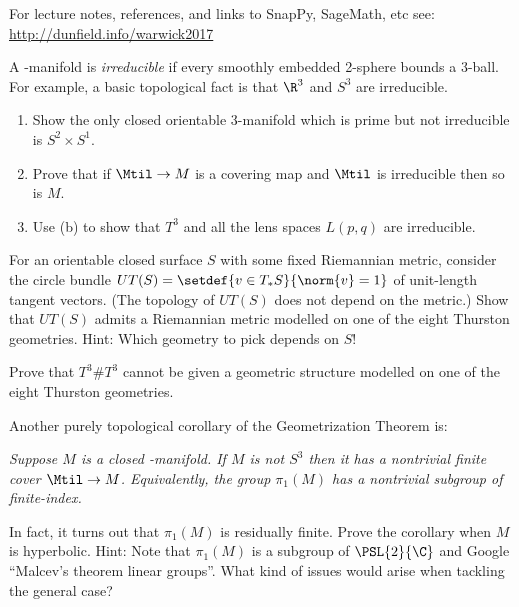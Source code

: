 \documentclass[tikz, a4paper]{nmd/hw}
\begin{document}

For lecture notes, references, and links to SnapPy, SageMath, etc see:
\\
\url{http://dunfield.info/warwick2017}


\begin{problems}
\item A \3-manifold is \emph{irreducible} if every smoothly embedded
  2-sphere bounds a 3-ball.  For example, a basic topological fact is
  that $\R^3$ and $S^3$ are irreducible.
  \begin{enumerate}
    \item Show the only closed orientable 3-manifold which is prime
      but not irreducible is $S^2 \times S^1$.
    \item Prove that if $\Mtil \to M$ is a covering map and $\Mtil$ is
      irreducible then so is $M$.

    \item Use (b) to show that $T^3$ and all the lens
      spaces $L(p,q)$ are irreducible.
  \end{enumerate}

\item For an orientable closed surface $S$ with some fixed Riemannian
  metric, consider the circle bundle
  $UT(S) = \setdef{v \in T_*S}{\norm{v} = 1}$ of unit-length tangent
  vectors.  (The topology of $UT(S)$ does not depend on the metric.)
  Show that $UT(S)$ admits a Riemannian metric modelled on one of the
  eight Thurston geometries.  Hint: Which geometry to pick depends on $S$!
  
\item Prove that $T^3 \# T^3$ cannot be given a geometric structure
  modelled on one of the eight Thurston geometries.

\item Another purely topological corollary of the Geometrization Theorem is:

  \emph{Suppose $M$ is a closed \3-manifold.  If $M$ is not $S^3$ then it
    has a nontrivial finite cover $\Mtil \to M$.  Equivalently, the
    group $\pi_1(M)$ has a nontrivial subgroup of finite-index.}

  In fact, it turns out that $\pi_1(M)$ is residually finite.  Prove
  the corollary when $M$ is hyperbolic.  Hint: Note that $\pi_1(M)$ is
  a subgroup of $\PSL{2}{\C}$ and Google ``Malcev's theorem linear
  groups''.  What kind of issues would arise when tackling the general
  case?


\end{problems}
\end{document}
